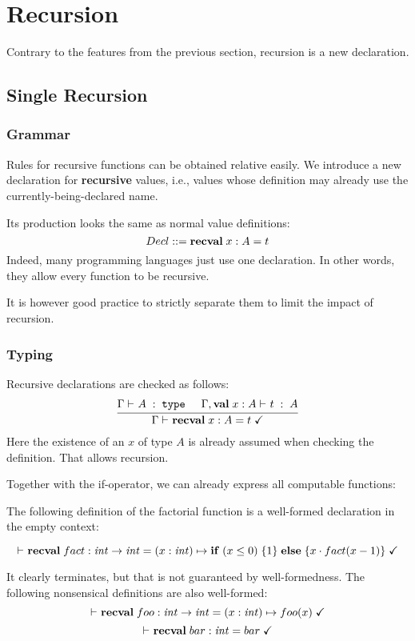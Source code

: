 \section{Recursion}

Contrary to the features from the previous section, recursion is a new declaration.

\subsection{Single Recursion}

\subsubsection{Grammar}

Rules for recursive functions can be obtained relative easily.
We introduce a new declaration for \textbf{recursive} values, i.e., values whose definition may already use the currently-being-declared name.

Its production looks the same as normal value definitions:
\[Decl ::= {\rm \bf rec val}\; x:A=t\]
Indeed, many programming languages just use one declaration.
In other words, they allow every function to be recursive.

It is however good practice to strictly separate them to limit the impact of recursion.

\subsubsection{Typing}

Recursive declarations are checked as follows:
\[\rul{\oftype{}{\Gamma}{A}{\type} \tb \oftype{}{\Gamma,\aval{x}{A}{}}{t}{A}}
      {\isdecl{}{\Gamma}{\arecval{x}{A}{t}}}
\]
Here the existence of an $x$ of type $A$ is already assumed when checking the definition.
That allows recursion.

Together with the if-operator, we can already express all computable functions:

\begin{example}
The following definition of the factorial function is a well-formed declaration in the empty context:

\[\isdecl{}{}{\arecval{fact}{\Int\to\Int}{\alam[\Int]{x}{\aifelseI{x\leq 0}{1}{x\cdot fact(x-1)}}}}\]

It clearly terminates, but that is not guaranteed by well-formedness.
The following nonsensical definitions are also well-formed:
\[\isdecl{}{}{\arecval{foo}{\Int\to\Int}{\alam[\Int]{x}{foo(x)}}}\]
\[\vdash^{}_{}{\rm \bf rec val}\; bar:\mathit{int}=bar\;\checkmark\]
\end{example}


